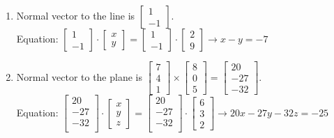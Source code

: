 \begin{Answer}
\begin{enumerate}[label=(\alph*)]
\item
Normal vector to the line is 
$\begin{bmatrix}
1\\
-1
\end{bmatrix}
$.\\
Equation: $\begin{bmatrix}
1\\
-1
\end{bmatrix}
\cdot
\begin{bmatrix}
x\\
y
\end{bmatrix}
=
\begin{bmatrix}
1\\
-1
\end{bmatrix}
\cdot
\begin{bmatrix}
2\\
9
\end{bmatrix}
\rightarrow
x - y = -7$
\item
Normal vector to the plane is 
$\begin{bmatrix}
7\\
4\\
1
\end{bmatrix}
\times
\begin{bmatrix}
8\\
0\\
5
\end{bmatrix}
=
\begin{bmatrix}
20\\
-27\\
-32
\end{bmatrix}
$.\\
Equation:
$\begin{bmatrix}
20\\
-27\\
-32\\
\end{bmatrix}
\cdot
\begin{bmatrix}
x\\
y\\
z
\end{bmatrix}
=
\begin{bmatrix}
20\\
-27\\
-32\\
\end{bmatrix}
\cdot
\begin{bmatrix}
6\\
3\\
2
\end{bmatrix}
\rightarrow
20x - 27y - 32z = -25$
\end{enumerate}
\end{Answer}

